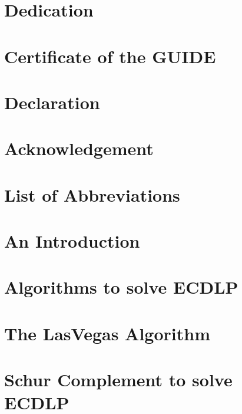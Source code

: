 \documentclass[12pt,twoside]{report}
\begin{document}




\tableofcontents


\chapter*{Dedication}


\chapter*{Certificate of the GUIDE}


\chapter*{Declaration}


\chapter*{Acknowledgement}


\listoffigures
\listoftables

\chapter*{List of Abbreviations}

\chapter{An Introduction }


\chapter[ECDLP]{Algorithms to solve ECDLP }


\chapter{The LasVegas Algorithm }


\chapter{Schur Complement to solve ECDLP }

\end{document}
